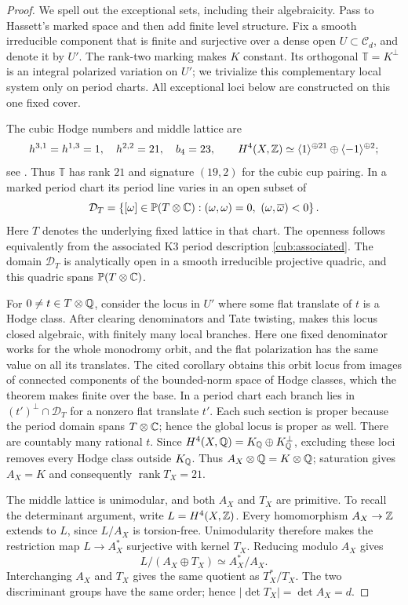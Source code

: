 \begin{proof}
We spell out the exceptional sets, including their algebraicity.
Pass to Hassett's marked space and then add finite level structure.
Fix a smooth irreducible component that is finite and surjective over
a dense open $U\subset\mathcal C_d$, and denote it by $U'$.
The rank-two marking makes $K$ constant. Its orthogonal
$\mathbb T=K^\perp$ is an integral polarized variation on $U'$;
we trivialize this complementary local system only on period charts.
All exceptional loci below are constructed on this one fixed cover.

The cubic Hodge numbers and middle lattice are
\[
 h^{3,1}=h^{1,3}=1,\quad h^{2,2}=21,\quad b_4=23,
 \qquad
 H^4(X,\mathbb Z)\simeq \langle1\rangle^{\oplus21}
                         \oplus\langle-1\rangle^{\oplus2};
\]
see \cite[Section~2.1 and Proposition~2.1.2]{Hassett00}.
Thus $\mathbb T$ has rank $21$ and signature $(19,2)$ for the cubic
cup pairing.  In a marked period chart its period line varies in an
open subset of
\[
 \mathcal D_T=
 \left\{[\omega]\in\mathbb P(T\otimes\C):
      (\omega,\omega)=0,\ (\omega,\overline\omega)<0\right\}.
\]
Here $T$ denotes the underlying fixed lattice in that chart.  The
openness follows equivalently from the associated K3 period description
\eqref{cub:associated}. The domain $\mathcal D_T$ is analytically open in a smooth
irreducible projective quadric, and this quadric spans
$\mathbb P(T\otimes\mathbb C)$.

For $0\ne t\in T\otimes\mathbb Q$, consider the locus in $U'$ where some
flat translate of $t$ is a Hodge class. After clearing denominators
and Tate twisting, \cite[Theorem~1.1 and Corollary~1.3]{CDK95} makes
this locus closed algebraic, with finitely many local branches.
Here one fixed denominator works for the whole monodromy orbit, and
the flat polarization has the same value on all its translates.
The cited corollary obtains this orbit locus from images of connected
components of the bounded-norm space of Hodge classes, which the
theorem makes finite over the base.
In a period chart each branch lies in
$(t')^\perp\cap\mathcal D_T$ for a nonzero flat translate $t'$.
Each such section is proper because the period domain spans
$T\otimes\mathbb C$; hence the global locus is proper as well.
There are countably many rational $t$. Since
$H^4(X,\mathbb Q)=K_\mathbb Q\oplus K_\mathbb Q^\perp$, excluding these loci removes every
Hodge class outside $K_\mathbb Q$. Thus $A_X\otimes\mathbb Q=K\otimes\mathbb Q$;
saturation gives $A_X=K$ and consequently $\operatorname{rank}T_X=21$.

The middle lattice is unimodular, and both $A_X$ and $T_X$ are
primitive.  To recall the determinant argument, write $L=H^4(X,\mathbb Z)$.
Every homomorphism $A_X\to\mathbb Z$ extends to $L$, since $L/A_X$ is
torsion-free.  Unimodularity therefore makes the restriction map
$L\to A_X^*$ surjective with kernel $T_X$.  Reducing modulo $A_X$
gives
\[
 L/(A_X\oplus T_X)\simeq A_X^*/A_X.
\]
Interchanging $A_X$ and $T_X$ gives the same quotient as $T_X^*/T_X$.
The two discriminant groups have the same order; hence
$|\det T_X|=\det A_X=d$.


\end{proof}
